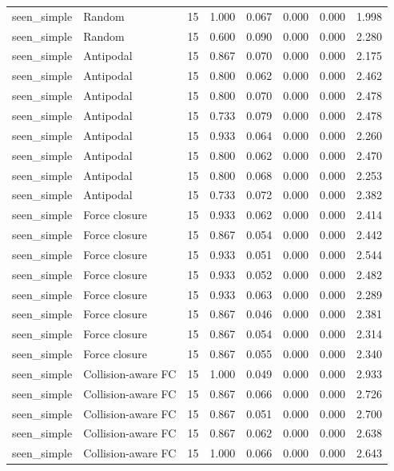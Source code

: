 {\begin{longtable}{llrrrrrr}
seen\_simple & Random & 15 & 1.000 & 0.067 & 0.000 & 0.000 & 1.998 \\
seen\_simple & Random & 15 & 0.600 & 0.090 & 0.000 & 0.000 & 2.280 \\
seen\_simple & Antipodal & 15 & 0.867 & 0.070 & 0.000 & 0.000 & 2.175 \\
seen\_simple & Antipodal & 15 & 0.800 & 0.062 & 0.000 & 0.000 & 2.462 \\
seen\_simple & Antipodal & 15 & 0.800 & 0.070 & 0.000 & 0.000 & 2.478 \\
seen\_simple & Antipodal & 15 & 0.733 & 0.079 & 0.000 & 0.000 & 2.478 \\
seen\_simple & Antipodal & 15 & 0.933 & 0.064 & 0.000 & 0.000 & 2.260 \\
seen\_simple & Antipodal & 15 & 0.800 & 0.062 & 0.000 & 0.000 & 2.470 \\
seen\_simple & Antipodal & 15 & 0.800 & 0.068 & 0.000 & 0.000 & 2.253 \\
seen\_simple & Antipodal & 15 & 0.733 & 0.072 & 0.000 & 0.000 & 2.382 \\
seen\_simple & Force closure & 15 & 0.933 & 0.062 & 0.000 & 0.000 & 2.414 \\
seen\_simple & Force closure & 15 & 0.867 & 0.054 & 0.000 & 0.000 & 2.442 \\
seen\_simple & Force closure & 15 & 0.933 & 0.051 & 0.000 & 0.000 & 2.544 \\
seen\_simple & Force closure & 15 & 0.933 & 0.052 & 0.000 & 0.000 & 2.482 \\
seen\_simple & Force closure & 15 & 0.933 & 0.063 & 0.000 & 0.000 & 2.289 \\
seen\_simple & Force closure & 15 & 0.867 & 0.046 & 0.000 & 0.000 & 2.381 \\
seen\_simple & Force closure & 15 & 0.867 & 0.054 & 0.000 & 0.000 & 2.314 \\
seen\_simple & Force closure & 15 & 0.867 & 0.055 & 0.000 & 0.000 & 2.340 \\
seen\_simple & Collision-aware FC & 15 & 1.000 & 0.049 & 0.000 & 0.000 & 2.933 \\
seen\_simple & Collision-aware FC & 15 & 0.867 & 0.066 & 0.000 & 0.000 & 2.726 \\
seen\_simple & Collision-aware FC & 15 & 0.867 & 0.051 & 0.000 & 0.000 & 2.700 \\
seen\_simple & Collision-aware FC & 15 & 0.867 & 0.062 & 0.000 & 0.000 & 2.638 \\
seen\_simple & Collision-aware FC & 15 & 1.000 & 0.066 & 0.000 & 0.000 & 2.643 \\

\end{longtable}}
